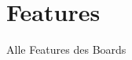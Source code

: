 









\section{Features}\label{Features}
Alle Features des Boards\\
\\
%
%
%



















